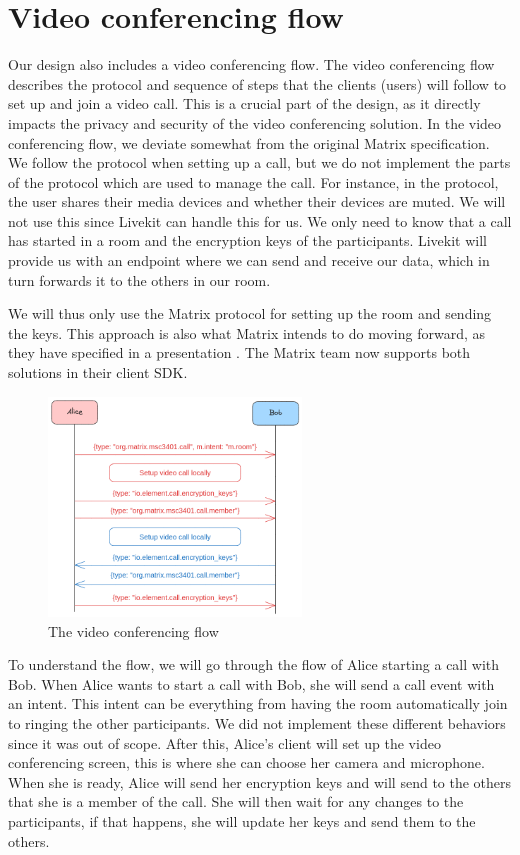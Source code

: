 \documentclass{report}
\begin{document}
\section{Video conferencing flow}
Our design also includes a video conferencing flow. The video conferencing flow describes the protocol and sequence
of steps that the clients (users) will follow to set up and join a video call.
This is a crucial part of the design, as it directly impacts the privacy and security of the video conferencing solution.
In the video conferencing flow, we deviate somewhat from the original Matrix specification. We follow the protocol
when setting up a call, but we do not implement the parts of the protocol which are used to manage the call. For
instance, in the protocol, the user shares their media devices and whether their devices are muted. We will not use
this since Livekit can handle this for us. We only need to know that a call has started in a room and the encryption
keys of the participants. Livekit will provide us with an endpoint where we can send and receive our data, which in
turn forwards it to the others in our room.

We will thus only use the Matrix protocol for setting up the room and sending the keys. This approach is also what
Matrix intends to do moving forward, as they have specified in a presentation \cite{nirve_matrixrtc_nodate}. The
Matrix team now supports both solutions in their client SDK.

\begin{figure}
\centering
\includegraphics[width=0.6\textwidth]{img/Callflow.excalidraw.png}
\caption{The video conferencing flow}
\label{fig:video-conference-flow}
\end{figure}

To understand the flow, we will go through the flow of Alice starting a call with Bob.
When Alice wants to start a call with Bob, she will send a call event with an intent. This intent can be
everything from having the room automatically join to ringing the other participants. We did not implement
these different behaviors since it was out of scope. After this, Alice's client will set up the video conferencing
screen, this is where she can choose her camera and microphone. When she is ready, Alice will send her encryption
keys and will send to the others that she is a member of the call. She will then wait for any changes to the
participants, if that happens, she will update her keys and send them to the others.
\end{document}

